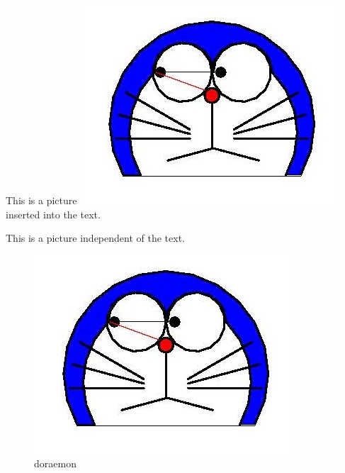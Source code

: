 \documentclass{article}
\begin{document}
\setlength{\fboxsep}{.5cm}

This is a picture \includegraphics{doraemon1.jpg} inserted into the text.

This is a picture independent of the text.
\begin{figure}[htbp]
\centering
\includegraphics{doraemon1.jpg}
\caption{doraemon}
\end{figure}
\end{document}
